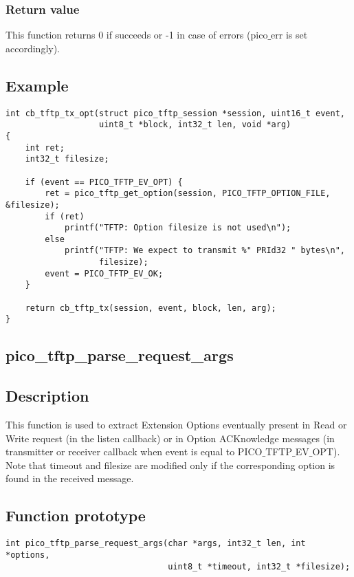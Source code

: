 \subsubsection*{Return value}
This function returns 0 if succeeds or -1 in case of errors (pico$\_$err is set accordingly).

\subsection*{Example}
\begin{verbatim}
int cb_tftp_tx_opt(struct pico_tftp_session *session, uint16_t event,
                   uint8_t *block, int32_t len, void *arg)
{
    int ret;
    int32_t filesize;

    if (event == PICO_TFTP_EV_OPT) {
        ret = pico_tftp_get_option(session, PICO_TFTP_OPTION_FILE, &filesize);
        if (ret)
            printf("TFTP: Option filesize is not used\n");
        else
            printf("TFTP: We expect to transmit %" PRId32 " bytes\n",
                   filesize);
        event = PICO_TFTP_EV_OK;
    }

    return cb_tftp_tx(session, event, block, len, arg);
}
\end{verbatim}


\subsection{pico\_tftp\_parse\_request\_args}

\subsection*{Description}
This function is used to extract Extension Options eventually present in Read or Write request (in the listen callback) or in Option ACKnowledge messages (in transmitter or receiver callback when event is equal to PICO$\_$TFTP$\_$EV$\_$OPT).
Note that timeout and filesize are modified only if the corresponding option is found in the received message.

\subsection*{Function prototype}
\begin{verbatim}
int pico_tftp_parse_request_args(char *args, int32_t len, int *options,
                                 uint8_t *timeout, int32_t *filesize);
\end{verbatim}


